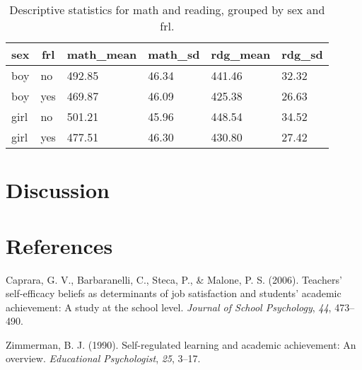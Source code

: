 \documentclass[man,floatsintext]{apa6}
\begin{document}
\begin{table}[h]
\begin{center}
\begin{threeparttable}
\caption{\label{tab:create_table}Descriptive statistics for math and reading, grouped by sex and frl.}
\begin{tabular}{llllll}
\toprule
sex & \multicolumn{1}{c}{frl} & \multicolumn{1}{c}{math\_mean} & \multicolumn{1}{c}{math\_sd} & \multicolumn{1}{c}{rdg\_mean} & \multicolumn{1}{c}{rdg\_sd}\\
\midrule
boy & no & 492.85 & 46.34 & 441.46 & 32.32\\
boy & yes & 469.87 & 46.09 & 425.38 & 26.63\\
girl & no & 501.21 & 45.96 & 448.54 & 34.52\\
girl & yes & 477.51 & 46.30 & 430.80 & 27.42\\
\bottomrule
\end{tabular}
\end{threeparttable}
\end{center}
\end{table}

\newpage

\section{Discussion}\label{discussion}

\newpage

\section{References}\label{references}

\begingroup
\setlength{\parindent}{-0.5in} \setlength{\leftskip}{0.5in}

\hypertarget{refs}{}
\hypertarget{ref-caprara2006teachers}{}
Caprara, G. V., Barbaranelli, C., Steca, P., \& Malone, P. S. (2006).
Teachers' self-efficacy beliefs as determinants of job satisfaction and
students' academic achievement: A study at the school level.
\emph{Journal of School Psychology}, \emph{44}, 473--490.

\hypertarget{ref-zimmerman1990self}{}
Zimmerman, B. J. (1990). Self-regulated learning and academic
achievement: An overview. \emph{Educational Psychologist}, \emph{25},
3--17.

\endgroup
\end{document}
